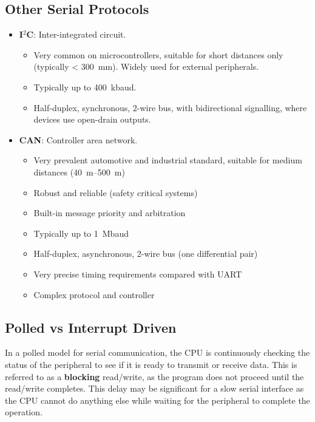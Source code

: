 \documentclass[a4paper]{report}
\begin{document}
\subsection{Other Serial Protocols}
\begin{itemize}
    \item \textbf{I\({}^2\)C}: Inter-integrated circuit.
          \begin{itemize}
              \item Very common on microcontrollers, suitable for short distances only (typically < \qty{300}{mm}). Widely used for external peripherals.
              \item Typically up to \qty{400}{kbaud}.
              \item Half-duplex, synchronous, 2-wire bus, with bidirectional signalling, where devices use open-drain outputs.
          \end{itemize}
    \item \textbf{CAN}: Controller area network.
          \begin{itemize}
              \item Very prevalent automotive and industrial standard, suitable for medium distances (\qtyrange{40}{500}{m})
              \item Robust and reliable (safety critical systems)
              \item Built-in message priority and arbitration
              \item Typically up to \qty{1}{Mbaud}
              \item Half-duplex, asynchronous, 2-wire bus (one differential pair)
              \item Very precise timing requirements compared with UART
              \item Complex protocol and controller
          \end{itemize}
\end{itemize}
\subsection{Polled vs Interrupt Driven}
In a polled model for serial communication, the CPU is continuously checking the status of the peripheral to see if it is ready to transmit or receive data.
This is referred to as a \textbf{blocking} read/write, as the program does not proceed until the read/write completes.
This delay may be significant for a slow serial interface as the CPU cannot do anything else while waiting for the peripheral to complete the operation.
\end{document}
